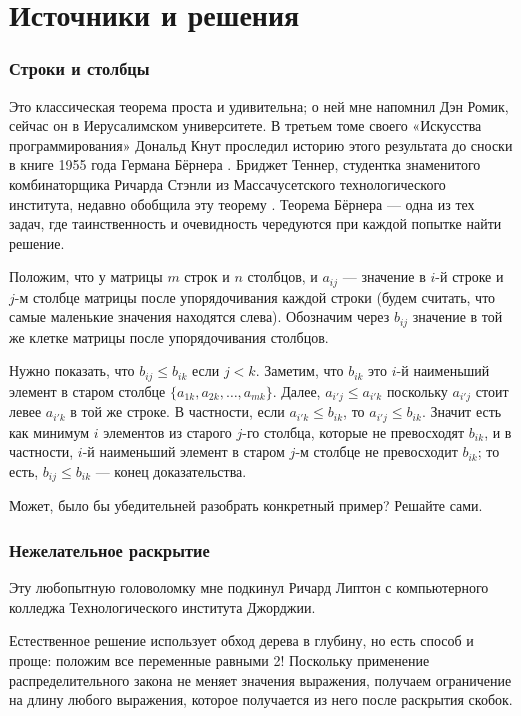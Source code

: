 \section*{Источники и решения}

\subsubsection*{Строки и столбцы}

Это классическая теорема проста и удивительна; о ней мне напомнил Дэн Ромик, сейчас он в Иерусалимском университете.
В третьем томе своего «Искусства программирования» \cite{41} Дональд Кнут проследил историю этого результата до сноски в книге 1955 года Германа Бёрнера \cite{7}.
Бриджет Теннер, студентка знаменитого комбинаторщика Ричарда Стэнли из Массачусетского технологического института, недавно обобщила эту теорему \cite{57}.
Теорема Бёрнера --- одна из тех задач, где таинственность и очевидность чередуются при каждой попытке найти решение.

Положим, что у матрицы $m$ строк и $n$ столбцов, и $a_{ij}$ --- значение в $i$-й строке и $j$-м столбце матрицы
после упорядочивания каждой строки (будем считать, что самые маленькие значения находятся слева).
Обозначим через $b_{ij}$ значение в той же клетке матрицы после упорядочивания столбцов.

Нужно показать, что $b_{ij} \le b_{ik}$ если $j < k$.
Заметим, что $b_{ik}$ это $i$-й наименьший элемент в старом столбце $\{a_{1k}, a_{2k}, \dots, a_{mk}\}$.
Далее, $a_{i'j}\le a_{i'k}$ поскольку $a_{i'j}$ стоит левее $a_{i'k}$ в той же строке.
В частности, если $a_{i'k}\le b_{ik}$, то $a_{i'j}\le b_{ik}$.
Значит есть как минимум $i$ элементов из старого $j$-го столбца, которые не превосходят $b_{ik}$,
и в частности, $i$-й наименьший элемент в старом $j$-м столбце не превосходит $b_{ik}$;
то есть, $b_{ij} \le b_{ik}$ --- конец доказательства.

Может, было бы убедительней разобрать конкретный пример?
Решайте сами.

\subsubsection*{Нежелательное раскрытие}

Эту любопытную головоломку мне подкинул Ричард Липтон с компьютерного колледжа Технологического института Джорджии.

Естественное решение использует обход дерева в глубину, но есть способ и проще:
положим все переменные равными 2!
Поскольку применение распределительного закона не меняет значения выражения, получаем ограничение на длину любого выражения, которое получается из него после раскрытия скобок.

